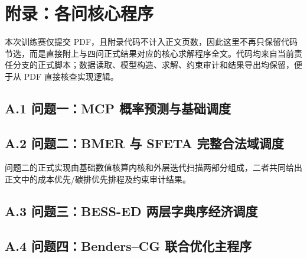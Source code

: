 \section*{附录：各问核心程序}

本次训练赛仅提交 PDF，且附录代码不计入正文页数，因此这里不再只保留代码节选，而是直接附上与四问正式结果对应的核心求解程序全文。代码均来自当前责任分支的正式脚本；数据读取、模型构造、求解、约束审计和结果导出均保留，便于从 PDF 直接核查实现逻辑。

\begingroup
\lstset{
  language=Python,
  basicstyle=\ttfamily\tiny,
  numbers=left,
  numberstyle=\tiny,
  stepnumber=1,
  numbersep=5pt,
  columns=fullflexible,
  breaklines=true,
  breakatwhitespace=false,
  showstringspaces=false,
  tabsize=4,
  frame=single
}

\subsection*{A.1 问题一：MCP 概率预测与基础调度}


\subsection*{A.2 问题二：BMER 与 SFETA 完整合法域调度}
问题二的正式实现由基础数值核算内核和外层迭代扫描两部分组成，二者共同给出正文中的成本优先/碳排优先排程及约束审计结果。





\subsection*{A.3 问题三：BESS-ED 两层字典序经济调度}


\subsection*{A.4 问题四：Benders--CG 联合优化主程序}


